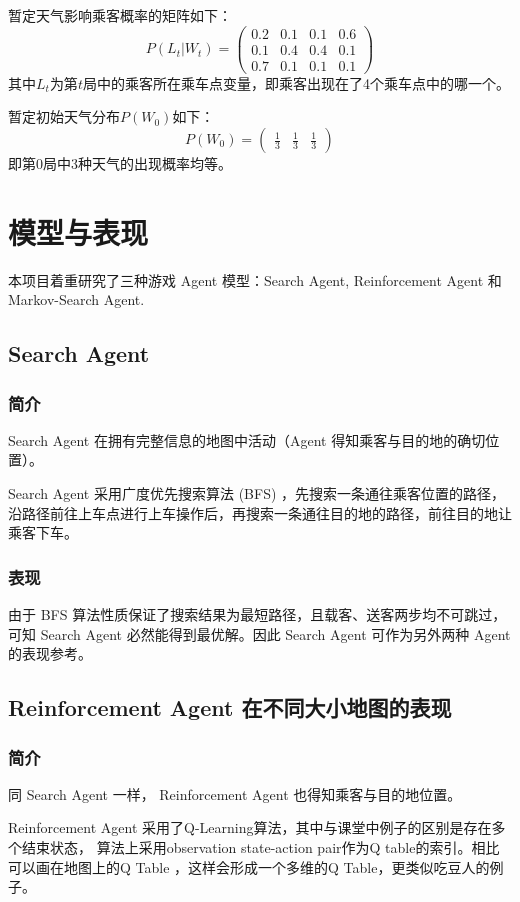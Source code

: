 \documentclass{article}
\begin{document}
\begin{CJK}{UTF8}{gbsn}
暂定天气影响乘客概率的矩阵如下：
$$P(L_t|W_t)=\begin{pmatrix}
  0.2 & 0.1 & 0.1 & 0.6 \\
  0.1&0.4&0.4&0.1\\
  0.7&0.1&0.1&0.1
\end{pmatrix}$$
其中$L_t$为第$t$局中的乘客所在乘车点变量，即乘客出现在了4个乘车点中的哪一个。

暂定初始天气分布$P(W_0)$如下：
$$P(W_0)=\begin{pmatrix}
  \frac{1}{3} & \frac{1}{3} & \frac{1}{3}
\end{pmatrix}$$
即第0局中3种天气的出现概率均等。

\section{模型与表现}
本项目着重研究了三种游戏 Agent 模型：Search Agent, Reinforcement Agent 和 Markov-Search Agent.

\subsection{Search Agent}
\subsubsection{简介}
Search Agent 在拥有完整信息的地图中活动（Agent 得知乘客与目的地的确切位置）。

Search Agent 采用广度优先搜索算法 (BFS) ，先搜索一条通往乘客位置的路径，沿路径前往上车点进行上车操作后，再搜索一条通往目的地的路径，前往目的地让乘客下车。

\subsubsection{表现}
由于 BFS 算法性质保证了搜索结果为最短路径，且载客、送客两步均不可跳过，可知 Search Agent 必然能得到最优解。因此 Search Agent 可作为另外两种 Agent 的表现参考。

\subsection{Reinforcement Agent 在不同大小地图的表现}
\subsubsection{简介}
同 Search Agent 一样， Reinforcement Agent 也得知乘客与目的地位置。

Reinforcement Agent 采用了Q-Learning算法，其中与课堂中例子的区别是存在多个结束状态，
算法上采用observation state-action pair作为Q table的索引。相比可以画在地图上的Q Table
，这样会形成一个多维的Q Table，更类似吃豆人的例子。 


\end{CJK}
\end{document}
